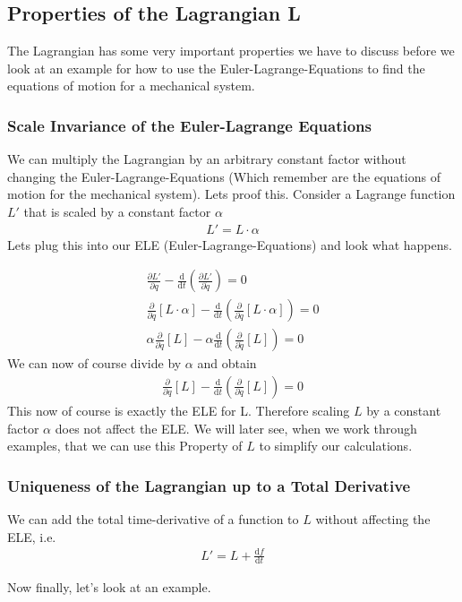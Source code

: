 \documentclass{article}
\begin{document}
	\subsection{Properties of the Lagrangian L}
	The Lagrangian has some very important properties we have to discuss before we look at an example for how to use the Euler-Lagrange-Equations to find the equations of motion for a mechanical system. 
	
	\subsubsection*{Scale Invariance of the Euler-Lagrange Equations}
	We can multiply the Lagrangian by an arbitrary constant factor without changing the Euler-Lagrange-Equations (Which remember are the equations of motion for the mechanical system).
	Lets proof this. Consider a Lagrange function $L'$ that is scaled by a constant factor $\alpha$
	\begin{align}
		L'=L\cdot\alpha
	\end{align}
	Lets plug this into our ELE (Euler-Lagrange-Equations) and look what happens.
	
	\begin{align}
		\frac{\partial L'}{\partial q}-\frac{\text{d}}{\text{d}t}\left(\frac{\partial L'}{\partial \dot{q}}\right) = 0\\
		\frac{\partial}{\partial q}\left[L\cdot\alpha\right]-\frac{\text{d}}{\text{d}t}\left(\frac{\partial}{\partial \dot{q}}\left[L\cdot\alpha\right]\right) = 0\\
		\alpha\frac{\partial}{\partial q}\left[L\right]-\alpha\frac{\text{d}}{\text{d}t}\left(\frac{\partial}{\partial \dot{q}}\left[L\right]\right) = 0
	\end{align}
	We can now of course divide by $\alpha$ and obtain
	\begin{align}\frac{\partial}{\partial q}\left[L\right]-\frac{\text{d}}{\text{d}t}\left(\frac{\partial}{\partial \dot{q}}\left[L\right]\right) = 0
	\end{align}
	This now of course is exactly the ELE for L. Therefore scaling $L$ by a constant factor $\alpha$ does not affect the ELE. 
	We will later see, when we work through examples, that we can use this Property of $L$ to simplify our calculations. 
	
	\subsubsection*{Uniqueness of the Lagrangian up to a Total Derivative}
	We can add the total time-derivative of a function to $L$ without affecting the ELE, i.e.
	\begin{align}
		L' = L + \frac{\text{d} f}{\text{d}t}
	\end{align}
	
	Now finally, let's look at an example.
\end{document}
